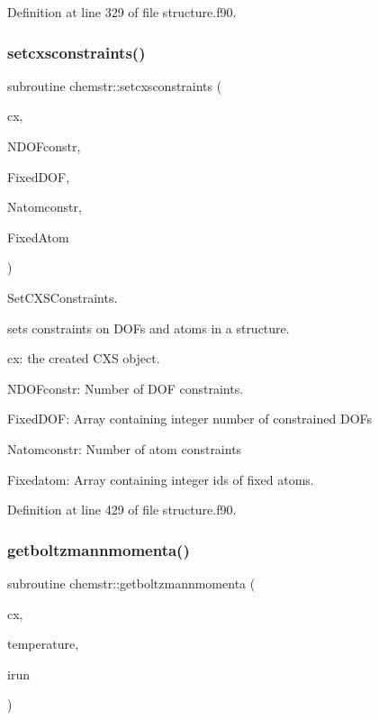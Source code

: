 Definition at line 329 of file structure.\+f90.

\mbox{\label{namespacechemstr_ac2d7e06af27d3d0883dd5e3cb31b4a51}} 
\subsubsection{\texorpdfstring{setcxsconstraints()}{setcxsconstraints()}}
{\footnotesize\ttfamily subroutine chemstr\+::setcxsconstraints (\begin{DoxyParamCaption}\item[{type(\mbox{\hyperlink{structchemstr_1_1cxs}{cxs}})}]{cx,  }\item[{integer, intent(in)}]{N\+D\+O\+Fconstr,  }\item[{integer, dimension($\ast$), intent(in)}]{Fixed\+D\+OF,  }\item[{integer, intent(in)}]{Natomconstr,  }\item[{integer, dimension($\ast$), intent(in)}]{Fixed\+Atom }\end{DoxyParamCaption})}



Set\+C\+X\+S\+Constraints. 

sets constraints on D\+O\+Fs and atoms in a structure.


\begin{DoxyItemize}
\item cx\+: the created C\+XS object.
\item N\+D\+O\+Fconstr\+: Number of D\+OF constraints.
\item Fixed\+D\+OF\+: Array containing integer number of constrained D\+O\+Fs
\item Natomconstr\+: Number of atom constraints
\item Fixedatom\+: Array containing integer ids of fixed atoms. 
\end{DoxyItemize}

Definition at line 429 of file structure.\+f90.

\mbox{\label{namespacechemstr_aaedb8aee0c6350f7609bd0a32926ee7f}} 
\subsubsection{\texorpdfstring{getboltzmannmomenta()}{getboltzmannmomenta()}}
{\footnotesize\ttfamily subroutine chemstr\+::getboltzmannmomenta (\begin{DoxyParamCaption}\item[{type(\mbox{\hyperlink{structchemstr_1_1cxs}{cxs}})}]{cx,  }\item[{real(8)}]{temperature,  }\item[{integer}]{irun }\end{DoxyParamCaption})}



